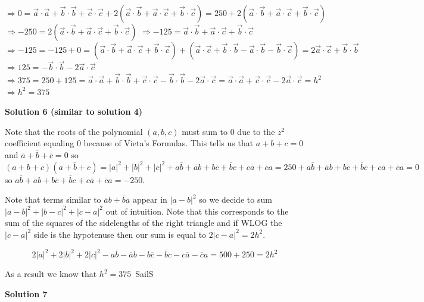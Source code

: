 \begin{enumerate}
 $\Rightarrow 0 = \Vec{a}\cdot \Vec{a} + \Vec{b}\cdot \Vec{b} + \Vec{c}\cdot \Vec{c} + 2(\Vec{a}\cdot \Vec{b} + \Vec{a}\cdot \Vec{c} + \Vec{b}\cdot \Vec{c}) = 250 + 2(\Vec{a}\cdot \Vec{b} + \Vec{a}\cdot \Vec{c} + \Vec{b}\cdot \Vec{c})$
$\Rightarrow -250 = 2(\Vec{a}\cdot \Vec{b} + \Vec{a}\cdot \Vec{c} + \Vec{b}\cdot \Vec{c})$
$\Rightarrow -125 = \Vec{a}\cdot \Vec{b} + \Vec{a}\cdot \Vec{c} + \Vec{b}\cdot \Vec{c}$
$\Rightarrow -125 = -125 + 0 = (\Vec{a}\cdot \Vec{b} + \Vec{a}\cdot \Vec{c} + \Vec{b}\cdot \Vec{c}) + (\Vec{a}\cdot \Vec{c} + \Vec{b} \cdot \Vec{b} - \Vec{a} \cdot \Vec{b} - \Vec{b} \cdot \Vec{c}) = 2\Vec{a}\cdot \Vec{c} + \Vec{b} \cdot \Vec{b}$
$\Rightarrow 125 = - \Vec{b} \cdot \Vec{b} - 2\Vec{a}\cdot \Vec{c}$
$\Rightarrow 375 = 250 + 125 = \Vec{a}\cdot \Vec{a} + \Vec{b}\cdot \Vec{b} + \Vec{c}\cdot \Vec{c} - \Vec{b} \cdot \Vec{b} - 2\Vec{a}\cdot \Vec{c} = \Vec{a}\cdot \Vec{a} + \Vec{c}\cdot \Vec{c} - 2\Vec{a}\cdot \Vec{c} = h^2$
$\Rightarrow h^2 = \boxed{375}$




\textbf{Solution 6 (similar to solution 4)}

Note that the roots of the polynomial $(a,b,c)$ must sum to $0$ due to the $z^2$ coefficient equaling $0$ because of Vieta's Formulas. This tells us that $a+b+c = 0$ and $\overline{a} + \overline{b} + \overline{c} = 0$ so $(a+b+c)(\overline{a+b+c}) = |a|^2 + |b|^2 + |c|^2 + a\overline{b} + \overline{a}b + b\overline{c} + \overline{b}c + c\overline{a} + \overline{c}a = 250 + a\overline{b} + \overline{a}b + b\overline{c} + \overline{b}c + c\overline{a} + \overline{c}a =  0$ so $a\overline{b} + \overline{a}b + b\overline{c} + \overline{b}c + c\overline{a} + \overline{c}a = -250.$

 Note that terms similar to $\overline{a}b + \overline{b}a$ appear in $|a-b|^2$ so we decide to sum $|a-b|^2 + |b-c|^2 + |c-a|^2$ out of intuition. Note that this corresponds to the sum of the squares of the sidelengths of the right triangle and if WLOG the $|c-a|^2$ side is the hypotenuse then our sum is equal to $2|c-a|^2 = 2h^2.$

 \[2|a|^2 + 2|b|^2 + 2|c|^2 -a\overline{b} - \overline{a}b - b\overline{c} - \overline{b}c - c\overline{a} - \overline{c}a = 500 + 250 = 2h^2\]

 As a result we know that $h^2 = \boxed{375}$~SailS

 



\textbf{Solution 7}


\end{enumerate}

